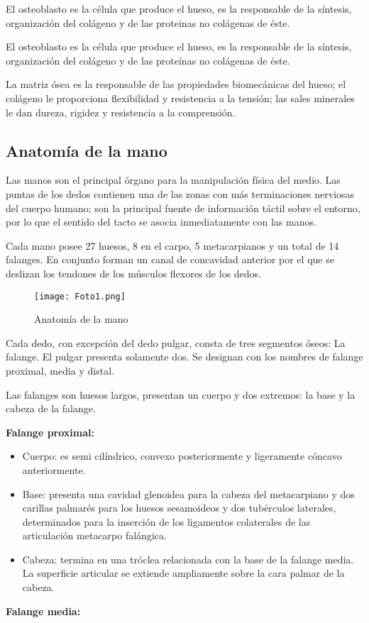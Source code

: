 \documentclass{article}
\begin{document}
El osteoblasto es la célula que produce el hueso, es la responsable de la síntesis, organización del colágeno y de las proteinas no colágenas de éste.

El osteoblasto es la célula que produce el hueso, es la responsable de la síntesis, organización del colágeno y de las proteínas no colágenas de éste.

La matriz ósea es la responsable de las propiedades biomecánicas del hueso; el colágeno le proporciona flexibilidad y resistencia a la tensión; las sales minerales le dan dureza, rigidez y resistencia a la comprensión.

\newpage
\subsection{\textbf{Anatomía de la mano}}

Las manos son el principal órgano para la manipulación física del medio. Las puntas de los dedos contienen una de las zonas con más terminaciones nerviosas del cuerpo humano; son la principal fuente de información táctil sobre el entorno, por lo que el sentido del tacto se asocia inmediatamente con las manos.

Cada mano posee 27 huesos, 8 en el carpo, 5 metacarpianos y un total de 14 falanges. En conjunto forman un canal de concavidad anterior por el que se deslizan los tendones de los músculos flexores de los dedos\cite{apastyle3}.

\begin{figure} [htp]%
    \centering
    \texttt{[image: Foto1.png]} %
    \caption{Anatomía de la mano}
    \label{grafica}
\end{figure}

Cada dedo, con excepción del dedo pulgar, consta de tres segmentos óseos: La falange. El pulgar presenta solamente dos. Se designan con los nombres de falange proximal, media y distal.

Las falanges son huesos largos, presentan un cuerpo y dos extremos: la base y la cabeza de la falange.

\textbf{Falange proximal:}

\begin{itemize}
\item Cuerpo: es semi cilíndrico, convexo posteriormente y ligeramente cóncavo anteriormente.
\item Base: presenta una cavidad glenoidea para la cabeza del metacarpiano y dos carillas palmarés para los huesos sesamoideos y dos tubérculos laterales, determinados para la inserción de los ligamentos colaterales de las articulación metacarpo falángica.
\item Cabeza: termina en una tróclea relacionada con la base de la falange media. La superficie articular se extiende ampliamente sobre la cara palmar de la cabeza.
\end{itemize}
\textbf{Falange media:}
\end{document}
